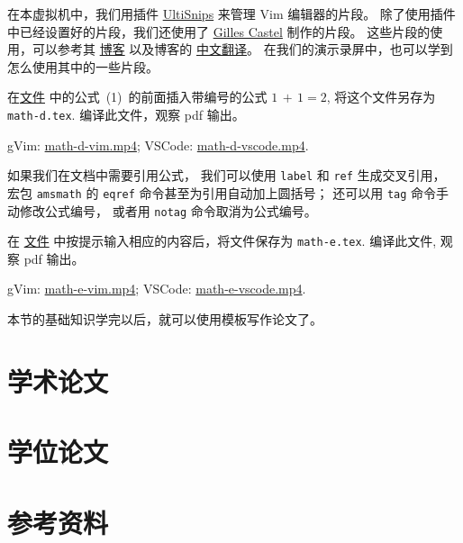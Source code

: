 \documentclass[
    11pt,
    base=hide,
    cite=authoryear,
    device=phone,
    lang=cn,
    mode=simple,
    result=answer,
    toc=onecol,
]{elegantbook_sierxue}
\begin{document}
在本虚拟机中，我们用插件
\href{https://github.com/SirVer/ultisnips}{UltiSnips}
来管理 Vim 编辑器的片段。
除了使用插件中已经设置好的片段，我们还使用了
\href{https://github.com/gillescastel/latex-snippets}{Gilles Castel}
制作的片段。
这些片段的使用，可以参考其
\href{https://castel.dev/post/lecture-notes-1/}{博客} 以及博客的
\href{https://bonxg.com/p/85.html}{中文翻译}。
在我们的演示录屏中，也可以学到怎么使用其中的一些片段。

\begin{exercise}\label{ex:math-d}
    在\href{learn-latex/basic-02/math-c.tex}{文件}
    中的公式~(1)~的前面插入带编号的公式 \(1\,+\,1 = 2\),
    将这个文件另存为 \texttt{math-d.tex}.
    编译此文件，观察 pdf 输出。
\end{exercise}
\begin{cast}\label{sol:math-d}
    gVim: \href{media/casts/math-d.mp4}{math-d-vim.mp4};
    VSCode: \href{media/casts/math-d.mp4}{math-d-vscode.mp4}.
\end{cast}

如果我们在文档中需要引用公式，
我们可以使用 \texttt{label} 和 \texttt{ref} 生成交叉引用，
宏包 \texttt{amsmath} 的 \texttt{eqref} 命令甚至为引用自动加上圆括号；
还可以用 \texttt{tag} 命令手动修改公式编号，
或者用 \texttt{notag} 命令取消为公式编号。

\begin{exercise}\label{ex:math-e}
    在 \href{learn-latex/basic-02/math-e.tex}{文件}
    中按提示输入相应的内容后，将文件保存为 \texttt{math-e.tex}.
    编译此文件, 观察 pdf 输出。
\end{exercise}
\begin{cast}\label{cast:math-e}
    gVim: \href{media/casts/math-e.mp4}{math-e-vim.mp4};
    VSCode: \href{media/casts/math-e.mp4}{math-e-vscode.mp4}.
\end{cast}
本节的基础知识学完以后，就可以使用模板写作论文了。

\newpage
\section{学术论文}%
\label{sec:latex-paper}

\newpage
\section{学位论文}%
\label{sec:latex-thesis}

\newpage
\section{参考资料}%
\label{sec:latex-refs}
\end{document}
